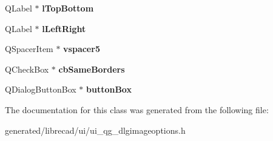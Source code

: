 \begin{DoxyCompactItemize}
\item 
\hypertarget{classUi__QG__ImageOptionsDialog_a06cdbd1c7dba168ae45f7ce91848e2d8}{Q\-Label $\ast$ {\bfseries l\-Top\-Bottom}}\label{classUi__QG__ImageOptionsDialog_a06cdbd1c7dba168ae45f7ce91848e2d8}

\item 
\hypertarget{classUi__QG__ImageOptionsDialog_a0b770043e9f445b513d229baaba6e7cb}{Q\-Label $\ast$ {\bfseries l\-Left\-Right}}\label{classUi__QG__ImageOptionsDialog_a0b770043e9f445b513d229baaba6e7cb}

\item 
\hypertarget{classUi__QG__ImageOptionsDialog_a62c8566f09d089a25cf5bef6718a4f7d}{Q\-Spacer\-Item $\ast$ {\bfseries vspacer5}}\label{classUi__QG__ImageOptionsDialog_a62c8566f09d089a25cf5bef6718a4f7d}

\item 
\hypertarget{classUi__QG__ImageOptionsDialog_aa2bf45c361237f4281140b8cf6011eda}{Q\-Check\-Box $\ast$ {\bfseries cb\-Same\-Borders}}\label{classUi__QG__ImageOptionsDialog_aa2bf45c361237f4281140b8cf6011eda}

\item 
\hypertarget{classUi__QG__ImageOptionsDialog_a0f73ef68e017b0bc35e069b918e4cfe8}{Q\-Dialog\-Button\-Box $\ast$ {\bfseries button\-Box}}\label{classUi__QG__ImageOptionsDialog_a0f73ef68e017b0bc35e069b918e4cfe8}

\end{DoxyCompactItemize}


The documentation for this class was generated from the following file\-:\begin{DoxyCompactItemize}
\item 
generated/librecad/ui/ui\-\_\-qg\-\_\-dlgimageoptions.\-h\end{DoxyCompactItemize}
